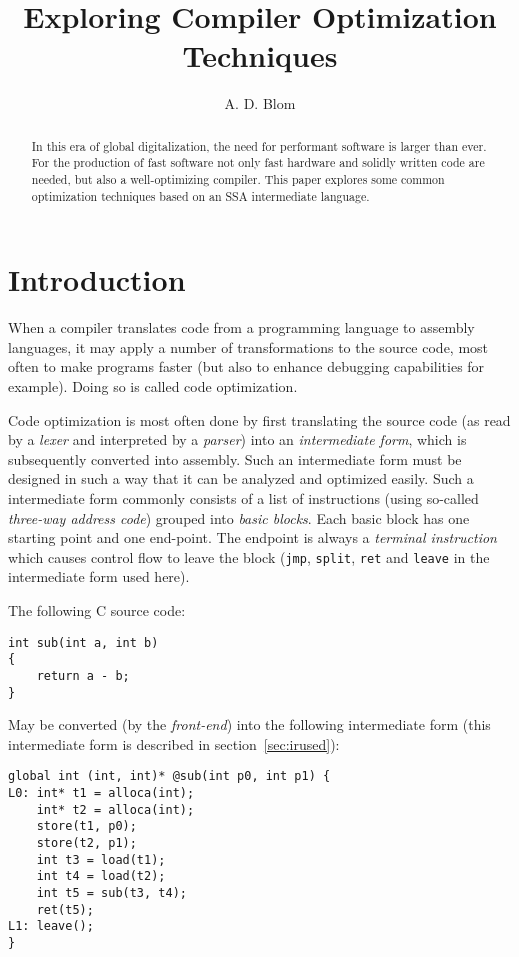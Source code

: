 \documentclass[12pt, a4paper]{article}
\title{Exploring Compiler Optimization Techniques}
\author{A. D. Blom}
\date{}
\begin{document}
 \sloppy
  \maketitle
  \begin{abstract}
In this era of global digitalization, the need for performant software is larger
than ever. For the production of fast software not only 
fast hardware and solidly written code are needed, but also a well-optimizing 
compiler. This paper explores some common optimization techniques based on an 
SSA intermediate language.
  \end{abstract}

  \section{Introduction}
When a compiler translates code from a programming language to assembly languages,
it may apply a number of transformations to the source code, most often to make
programs faster (but also to enhance debugging capabilities for example). Doing
so is called code optimization.

Code optimization is most often done by first translating the source code
(as read by a \textit{lexer} and interpreted by a \textit{parser}) into an
\textit{intermediate form}, which is subsequently converted into assembly.\cite{dragon}
Such an intermediate form must be designed in such a way that it can be analyzed and
optimized easily. Such a intermediate form commonly consists of a
list of instructions (using so-called \textit{three-way address code}) grouped
into \textit{basic blocks}. Each basic block has one starting point and one
end-point. The endpoint is always a \textit{terminal instruction}
which causes control flow to leave the block (\verb+jmp+, \verb+split+, \verb+ret+
and \verb+leave+ in the intermediate form used here).

The following C source code:

\begin{lstlisting}
int sub(int a, int b)
{
	return a - b;
}
\end{lstlisting}

May be converted (by the \textit{front-end}) into the following intermediate form
(this intermediate form is described in section~\ref{sec:irused}):

\begin{lstlisting}
global int (int, int)* @sub(int p0, int p1) {
L0:	int* t1 = alloca(int);
	int* t2 = alloca(int);
	store(t1, p0);
	store(t2, p1);
	int t3 = load(t1);
	int t4 = load(t2);
	int t5 = sub(t3, t4);
	ret(t5);
L1:	leave();
}
\end{lstlisting}
\end{document}
